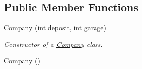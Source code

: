 \subsection*{Public Member Functions}
\begin{DoxyCompactItemize}
\item 
\hyperlink{class_company_a6d8fd907cbf1719460a8be113b6530ab}{Company} (int deposit, int garage)
\begin{DoxyCompactList}\small\item\em Constructor of a \hyperlink{class_company}{Company} class. \end{DoxyCompactList}\item 
\hyperlink{class_company_a29937dda711b09df306ae7ca9b3d6b42}{Company} ()\hypertarget{class_company_a29937dda711b09df306ae7ca9b3d6b42}{}\label{class_company_a29937dda711b09df306ae7ca9b3d6b42}


\end{DoxyCompactItemize}
